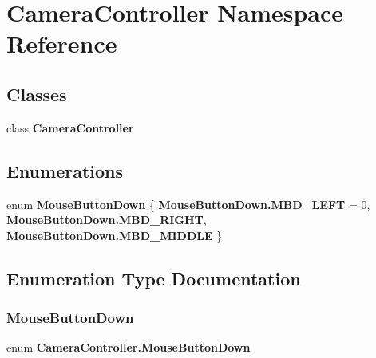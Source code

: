 \section{Camera\+Controller Namespace Reference}
\label{namespace_camera_controller}
\subsection*{Classes}
\begin{DoxyCompactItemize}
\item 
class \textbf{ Camera\+Controller}
\end{DoxyCompactItemize}
\subsection*{Enumerations}
\begin{DoxyCompactItemize}
\item 
enum \textbf{ Mouse\+Button\+Down} \{ \textbf{ Mouse\+Button\+Down.\+M\+B\+D\+\_\+\+L\+E\+FT} = 0, 
\textbf{ Mouse\+Button\+Down.\+M\+B\+D\+\_\+\+R\+I\+G\+HT}, 
\textbf{ Mouse\+Button\+Down.\+M\+B\+D\+\_\+\+M\+I\+D\+D\+LE}
 \}
\end{DoxyCompactItemize}


\subsection{Enumeration Type Documentation}
\mbox{\label{namespace_camera_controller_a96ac0ac93f875c685423cfc822935812}} 
\subsubsection{Mouse\+Button\+Down}
{\footnotesize\ttfamily enum \textbf{ Camera\+Controller.\+Mouse\+Button\+Down}\hspace{0.3cm}{\ttfamily [strong]}}

